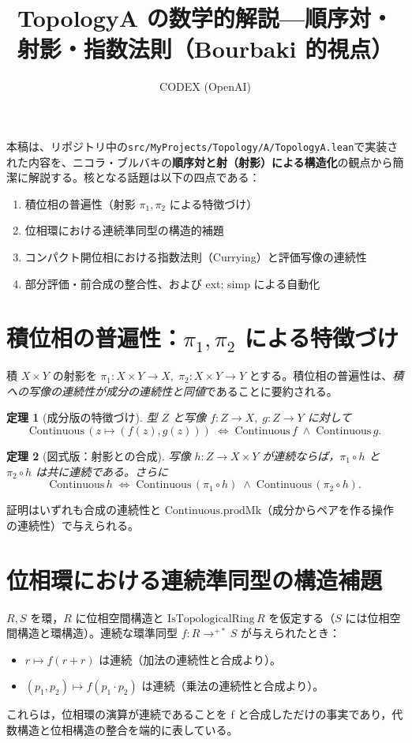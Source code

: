 \documentclass[11pt]{jsarticle}
\title{TopologyA の数学的解説\;—\;順序対・射影・指数法則（Bourbaki 的視点）}
\author{CODEX (OpenAI)}
\date{}
\newtheorem{theorem}{定理}
\theoremstyle{remark}
\begin{document}
\maketitle

本稿は、リポジトリ中の\verb|src/MyProjects/Topology/A/TopologyA.lean|で実装された内容を、ニコラ・ブルバキの\textbf{順序対と射（射影）による構造化}の観点から簡潔に解説する。核となる話題は以下の四点である：
\begin{enumerate}[(1)]
  \item 積位相の普遍性（射影 $\pi_1,\pi_2$ による特徴づけ）
  \item 位相環における連続準同型の構造的補題
  \item コンパクト開位相における指数法則（Currying）と評価写像の連続性
  \item 部分評価・前合成の整合性、および ext; simp による自動化
\end{enumerate}

\section{積位相の普遍性：$\pi_1,\pi_2$ による特徴づけ}
積 $X\times Y$ の射影を $\pi_1:X\times Y\to X,\;\pi_2:X\times Y\to Y$ とする。積位相の普遍性は、\emph{積への写像の連続性が成分の連続性と同値}であることに要約される。

\begin{theorem}[成分版の特徴づけ]
型 $Z$ と写像 $f:Z\to X,\;g:Z\to Y$ に対して
\[
 \mathrm{Continuous}\,(z\mapsto (f(z),g(z)))\;\Longleftrightarrow\;\mathrm{Continuous}\,f\;\land\;\mathrm{Continuous}\,g.
\]
\end{theorem}

\begin{theorem}[図式版：射影との合成]
写像 $h:Z\to X\times Y$ が連続ならば，$\pi_1\circ h$ と $\pi_2\circ h$ は共に連続である。さらに
\[
 \mathrm{Continuous}\,h\;\Longleftrightarrow\;\mathrm{Continuous}\,(\pi_1\circ h)\;\land\;\mathrm{Continuous}\,(\pi_2\circ h).
\]
\end{theorem}

\noindent 証明はいずれも合成の連続性と $\mathrm{Continuous}.\mathrm{prodMk}$（成分からペアを作る操作の連続性）で与えられる。

\section{位相環における連続準同型の構造補題}
\label{sec:ring}
$R, S$ を環，$R$ に位相空間構造と $\mathrm{IsTopologicalRing}\,R$ を仮定する（$S$ には位相空間構造と環構造）。連続な環準同型 $f:R\to^{+\!*} S$ が与えられたとき：
\begin{itemize}
  \item $r\mapsto f(r+r)$ は連続（加法の連続性と合成より）。
  \item $(p_1,p_2)\mapsto f(p_1\cdot p_2)$ は連続（乗法の連続性と合成より）。
\end{itemize}
これらは，位相環の演算が連続であることを f と合成しただけの事実であり，代数構造と位相構造の整合を端的に表している。
\end{document}
